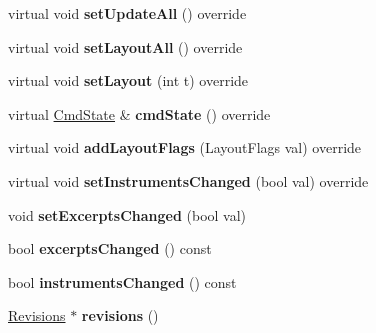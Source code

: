 \begin{DoxyCompactItemize}
\item 
\mbox{\label{class_ms_1_1_master_score_a4eff9c555cbf7ba2796edeb32ade9c48}} 
virtual void {\bfseries set\+Update\+All} () override
\item 
\mbox{\label{class_ms_1_1_master_score_acde585e72289ec5ce33af5d6f5df9e09}} 
virtual void {\bfseries set\+Layout\+All} () override
\item 
\mbox{\label{class_ms_1_1_master_score_a4189fc6258701fbe148f0cabfc97e089}} 
virtual void {\bfseries set\+Layout} (int t) override
\item 
\mbox{\label{class_ms_1_1_master_score_a997adfa0b4dcd4185284cb2f8b50117b}} 
virtual \hyperlink{class_ms_1_1_cmd_state}{Cmd\+State} \& {\bfseries cmd\+State} () override
\item 
\mbox{\label{class_ms_1_1_master_score_ae43aeeeaaf12c9b0c277840f53bfcf72}} 
virtual void {\bfseries add\+Layout\+Flags} (Layout\+Flags val) override
\item 
\mbox{\label{class_ms_1_1_master_score_a3846150ffb354bf8cff864674d899525}} 
virtual void {\bfseries set\+Instruments\+Changed} (bool val) override
\item 
\mbox{\label{class_ms_1_1_master_score_aa1cc400921b1a22ef5b53bbface243ae}} 
void {\bfseries set\+Excerpts\+Changed} (bool val)
\item 
\mbox{\label{class_ms_1_1_master_score_a01e360569f2908eae49bbf807d5ac62d}} 
bool {\bfseries excerpts\+Changed} () const
\item 
\mbox{\label{class_ms_1_1_master_score_a6792e09d790e225e02677d8146fa19a2}} 
bool {\bfseries instruments\+Changed} () const
\item 
\mbox{\label{class_ms_1_1_master_score_a39b6367eb6956dc09de5ff377382ee47}} 
\hyperlink{class_ms_1_1_revisions}{Revisions} $\ast$ {\bfseries revisions} ()
\item 

\end{DoxyCompactItemize}
